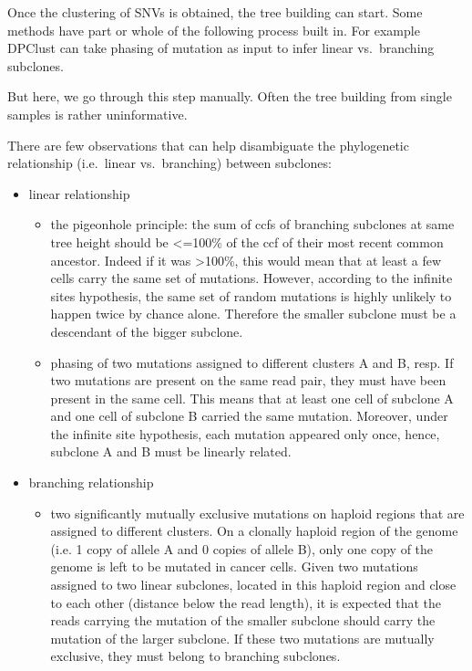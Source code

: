 \documentclass[]{article}
\begin{document}
Once the clustering of SNVs is obtained, the tree building can start.
Some methods have part or whole of the following process built in. For
example DPClust can take phasing of mutation as input to infer linear
vs.~branching subclones.

But here, we go through this step manually. Often the tree building from
single samples is rather uninformative.

There are few observations that can help disambiguate the phylogenetic
relationship (i.e.~linear vs.~branching) between subclones:

\begin{itemize}
\item{linear relationship}
  \begin{itemize}
 \item{the pigeonhole principle: the sum of ccfs of branching
     subclones at same tree height should be <=100\% of the ccf of
     their most recent common ancestor. Indeed if it was >100\%, this
     would mean that at least a few cells carry the same set of
     mutations. However, according to the infinite sites hypothesis, the same set of random mutations is highly
     unlikely to happen twice by chance alone. Therefore the
     smaller subclone must be a descendant of the bigger subclone.}
 \item{phasing of two mutations assigned to different clusters A and B, resp. If two
     mutations are present on the same read pair, they must have been
     present in the same cell. This means that at least one cell of subclone A and
     one cell of subclone B carried the same mutation. Moreover, under
     the infinite site hypothesis, each mutation appeared only once,
     hence, subclone A and B must be linearly related. }
 \end{itemize}
\item{branching relationship}
  \begin{itemize}
  \item{two significantly mutually exclusive mutations on haploid
      regions that are assigned to different clusters. On a clonally haploid
      region of the genome (i.e. 1 copy of allele A and 0 copies of
      allele B), only one copy of the genome is left to be
      mutated in cancer cells. Given two mutations assigned to two linear subclones,
      located in this haploid region and close to each other (distance
      below the read length), it is expected that the
      reads carrying the mutation of the smaller subclone should carry
      the mutation of the larger subclone. If these two mutations are
      mutually exclusive, they must belong to branching subclones.}
  \end{itemize}
\end{itemize}
\end{document}
